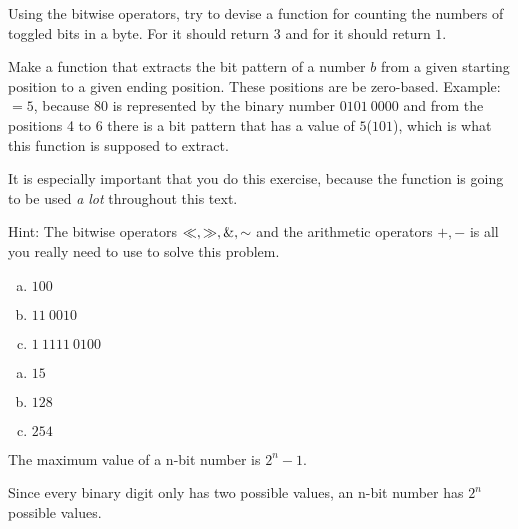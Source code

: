 \begin{Exercise}[label={bitcount}]
  Using the bitwise operators, try to devise a function
   for counting the numbers of toggled bits in a
  byte. For  it should return $3$ and for
   it should return $1$.

\end{Exercise}

\begin{Exercise}[label={getbits}]

  Make a function   that extracts
  the bit pattern of a number $b$ from a given starting position to a
  given ending position. These positions are be zero-based. Example:
  $=5$, because $80$ is represented by the
  binary number $0101\ 0000$ and from the positions 4 to 6 there is a
  bit pattern that has a value of $5$($101$), which is what this function is
  supposed to extract.

  It is especially important that you do this exercise, because the
  function  is going to be used \textit{a lot}
  throughout this text.

  Hint: The bitwise operators $\ll, \gg, \mathrel{\&},
  \mathord{\sim}$ and the arithmetic operators $+,-$ is all you really need to
  use to solve this problem.

\end{Exercise}

\answers{}

\begin{Answer}[ref={n-to-bin}]
  \begin{enumerate}[(a)]
  \item $100$
  \item $11\ 0010$
  \item $1\ 1111\ 0100$
  \end{enumerate}
\end{Answer}

\begin{Answer}[ref={bin-to-n}]
  \begin{enumerate}[(a)]
  \item $15$
  \item $128$
  \item $254$
  \end{enumerate}
\end{Answer}

\begin{Answer}[ref={n-bits-max-val}]
  The maximum value of a n-bit number is $2^n - 1$.

  Since every binary digit only has two possible values, an n-bit
  number has $2^n$ possible values.
\end{Answer}


